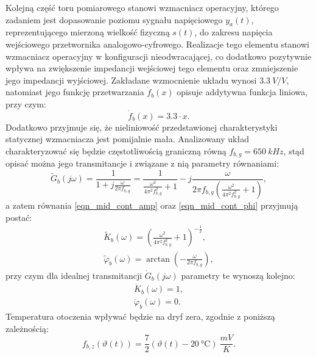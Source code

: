 Kolejną część toru pomiarowego stanowi wzmacniacz operacyjny, którego zadaniem jest dopasowanie poziomu sygnału napięciowego $y_{a}(t)$, reprezentującego mierzoną wielkość fizyczną $s(t)$, do zakresu napięcia wejściowego przetwornika analogowo-cyfrowego. Realizacje tego elementu stanowi wzmacniacz operacyjny w konfiguracji nieodwracającej, co dodatkowo pozytywnie wpływa na zwiększenie impedancji wejściowej tego elementu oraz zmniejszenie jego impedancji wyjściowej. Zakładane wzmocnienie układu wynosi $\qty{3.3}{V \per V}$, natomiast jego funkcję przetwarzania $\dot{f}_{b}(x)$ opisuje addytywna funkcja liniowa, przy czym:
\begin{equation}
\dot{f}_{b} \left( x \right) = 3.3 \cdot x \label{eqn_sym_partb_function}.
\end{equation}
Dodatkowo przyjmuje się, że nieliniowość przedstawionej charakterystyki statycznej wzmacniacza jest pomijalnie mała. Analizowany układ charakteryzować się będzie częstotliwością graniczną równą $f_{b,g} = \qty{650}{kHz}$, stąd opisać można jego transmitancje i związane z nią parametry równaniami:
\begin{equation}
\tilde{G}_{b} \left( j\omega \right) = \frac{1}{1 + j \frac{\omega}{2 \pi f_{b,g}}} = \frac{1}{\frac{\omega^{2}}{4 \pi^{2} f_{b,g}^{2}} + 1} - j \frac{\omega}{2 \pi f_{b,g} \left( \frac{\omega^{2}}{4 \pi^{2} f_{b,g}^{2}} + 1 \right) } \label{eqn_sym_partb_trans},
\end{equation}
a zatem równania \eqref{eqn_mid_cont_amp} oraz \eqref{eqn_mid_cont_phi} przyjmują postać:
\begin{gather}
\tilde{K}_{b} \left( \omega \right) = \left( \frac{\omega^{2}}{4 \pi^{2} f_{b,g}^{2}} + 1 \right)^{-\frac{1}{2}} \label{eqn_sym_partb_amp_real}, \\
\tilde{\varphi}_{b} \left( \omega \right) = \arctan \left( -\frac{\omega}{2 \pi f_{b,g}} \right) \label{eqn_sym_partb_phi_real},
\end{gather}
przy czym dla idealnej transmitancji $\dot{G}_{b}(j\omega)$ parametry te wynoszą kolejno:
\begin{gather}
\dot{K}_{b} \left( \omega \right) = 1 \label{eqn_sym_partb_amp_ideal}, \\
\dot{\varphi}_{b} \left( \omega \right) = 0 \label{eqn_sym_partb_phi_ideal}.
\end{gather}
Temperatura otoczenia wpływać będzie na dryf zera, zgodnie z poniższą zależnością:
\begin{equation}
f_{b,z} \left( \vartheta \left( t \right) \right) = \frac{7}{2} \left( \vartheta \left( t \right) - \qty{20}{\degreeCelsius} \right) ~\unit{\frac{mV}{K}} \label{eqn_sym_partb_temp_err}.
\end{equation}

